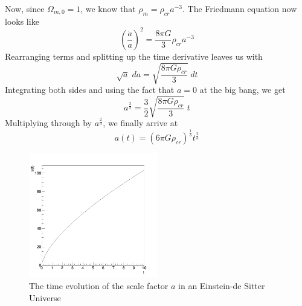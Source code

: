 \documentclass[aps,reprint,prl]{revtex4-1}
\begin{document}
Now, since $\Omega_{m,0}=1$, we know that $\rho_m=\rho_{cr}a^{-3}$.  The Friedmann equation now looks like
$$\left(\frac{\dot{a}}{a}\right)^2=\frac{8\pi G}{3}\rho_{cr}a^{-3}$$
Rearranging terms and splitting up the time derivative leaves us with
$$\sqrt{a}\;da=\sqrt{\frac{8\pi G \rho_{cr}}{3}}\;dt$$
Integrating both sides and using the fact that $a=0$ at the big bang, we get
$$a^{\frac{3}{2}}=\frac{3}{2}\sqrt{\frac{8\pi G \rho_{cr}}{3}}\;t$$
Multiplying through by $a^{\frac{2}{3}}$, we finally arrive at
$$a(t)=\left(6\pi G\rho_{cr}\right)^{\frac{1}{3}}t^{\frac{2}{3}}$$
\begin{figure}[h!]
\includegraphics[width=0.5\textwidth]{ps1_plots/a_einstein}
\caption{The time evolution of the scale factor $a$ in an Einstein-de Sitter Universe}
\end{figure}
\end{document}
